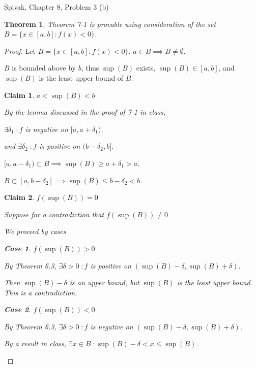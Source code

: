 \documentclass{article} %
\theoremstyle{plain}
\newtheorem*{theorem*}{Theorem}
\newtheorem*{claim*}{Claim}
\newtheorem{case}{Case}
\theoremstyle{definition}
\begin{document}
\noindent{} Spivak, Chapter 8, Problem 3 (b)

\begin{theorem*} Theorem 7-1 is provable using consideration of the set $B = \{x \in [a,b] \colon f(x) < 0 \}$.
\end{theorem*}

\begin{proof}
    Let $B = \{x \in [a,b] \colon f(x) < 0 \}$. $a \in B \implies B \neq \emptyset$.

    $B$ is bounded above by $b$, thus $\sup(B)$ exists, $\sup(B) \in [a,b]$, and $\sup(B)$ is the least upper bound of $B$.

    \begin{claim*} $a < \sup(B) < b$
        
        By the lemma discussed in the proof of 7-1 in class, 

        $\exists \delta_1 \; \colon f$ is negative on $[a, a+\delta_1)$.

        and $\exists \delta_2 \; \colon f$ is positive on $(b-\delta_2, b]$.

        $[a, a-\delta_1) \subset B \implies \sup(B) \geq a + \delta_1 > a$.

        $B \subset [a, b - \delta_2] \implies \sup(B) \leq b - \delta_2 < b$.
    \end{claim*}
    \begin{claim*} $f(\sup(B)) = 0$

        Suppose for a contradiction that $f(\sup(B)) \neq 0$

        We proceed by cases
        \setcounter{case}{0}

        \begin{case} $f(\sup(B)) > 0$

            By Theorem 6.3, $\exists \delta > 0 \; \colon f$ is positive on $(\sup(B) - \delta, \sup(B) + \delta)$.

            Then $\sup(B) - \delta$ is an upper bound, but $\sup(B)$ is the least upper bound.  This is a contradiction.
        \end{case}

        \begin{case} $f(\sup(B)) < 0$

            By Theorem 6.3, $\exists \delta > 0 \; \colon f$ is negative on $(\sup(B) - \delta, \sup(B) + \delta)$.

            By a result in class, $\exists x \in B \; \colon \sup(B) - \delta < x \leq \sup(B)$.  


\end{case}
\end{claim*}
\end{proof}
\end{document}
